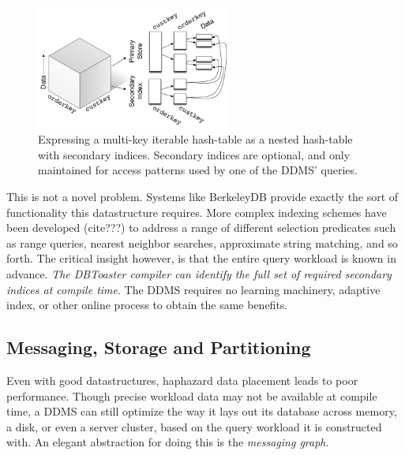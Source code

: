 \begin{figure}
\begin{center}
\includegraphics[width=2.5in]{graphics/MultikeyMap}
\end{center}
\caption{Expressing a multi-key iterable hash-table as a nested hash-table with secondary indices.  Secondary indices are optional, and only maintained for access patterns used by one of the DDMS' queries.}
\label{fig:diag:nestedHash}
\end{figure}

This is not a novel problem.  Systems like BerkeleyDB\cite{berkeleydb} provide exactly the sort of functionality this datastructure requires.  More complex indexing schemes have been developed (cite???) to address a range of different selection predicates such as range queries, nearest neighbor searches, approximate string matching, and so forth.  The critical insight however, is that the entire query workload is known in advance.  \textit{The DBToaster compiler can identify the full set of required secondary indices at compile time}.  The DDMS requires no learning machinery, adaptive index, or other online process to obtain the same benefits.


\subsection{Messaging, Storage and Partitioning}
Even with good datastructures, haphazard data placement leads to poor performance.  Though precise workload data may not be available at compile time, a DDMS can still optimize the way it lays out its database across memory, a disk, or even a server cluster, based on the query workload it is constructed with.  An elegant abstraction for doing this is the \textit{messaging graph}.

